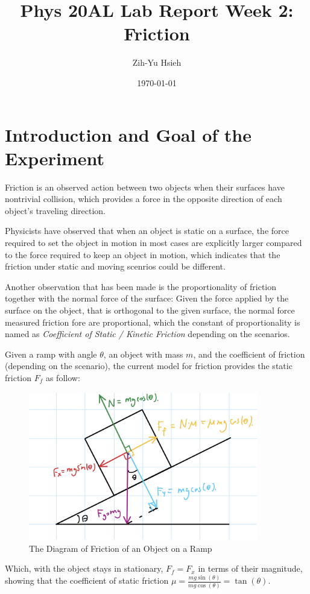 \documentclass{article}
\title{Phys 20AL Lab Report Week 2: Friction}
\author{Zih-Yu Hsieh}
\date{\today}
\begin{document}
\maketitle

\tableofcontents

\pagebreak 

\section{Introduction and Goal of the Experiment}
Friction is an observed action between two objects when their surfaces have nontrivial collision, which provides a force in the opposite direction of each object's traveling direction.

Physicists have observed that when an object is static on a surface, the force required to set the object in motion in most cases are explicitly larger compared to the force required to keep an object in motion, which indicates that the friction under static and moving scenrios could be different.

Another observation that has been made is the proportionality of friction together with the normal force of the surface: Given the force applied by the surface on the object, that is orthogonal to the given surface, the normal force measured friction fore are proportional, which the constant of proportionality is named as \emph{Coefficient of Static / Kinetic Friction} depending on the scenarios.

\hfil

Given a ramp with angle $\theta$, an object with mass $m$, and the coefficient of friction (depending on the scenario), the current model for friction provides the static friction $F_f$ as follow:
\begin{figure}[h!]
    \centering
    \includegraphics[width=100mm]{friction_explain.jpg}
    \caption{The Diagram of Friction of an Object on a Ramp}
\end{figure}
Which, with the object stays in stationary, $F_f=F_x$ in terms of their magnitude, showing that the coefficient of static friction $\mu = \frac{mg\sin(\theta)}{mg\cos(\theta)} = \tan(\theta)$.
\end{document}
